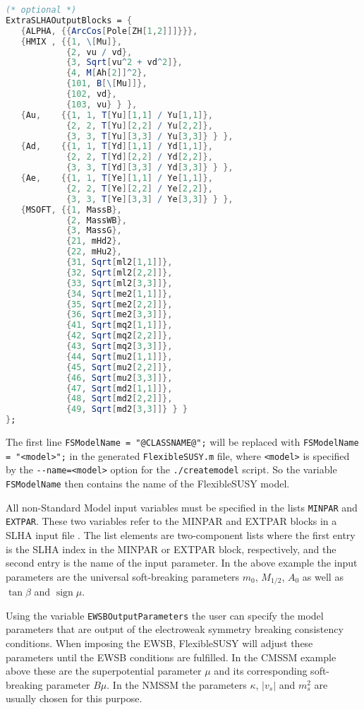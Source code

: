 \documentclass[final,3p,11pt,pdflatex]{elsarticle}
\makeatletter
\newcommand{\fs}{FlexibleSUSY\@\xspace}
\newcommand{\code}[1]{\lstinline|#1|}  %
\DeclareMathOperator{\sign}{sign}
\makeatother
\begin{document}
\begin{lstlisting}[language=Mathematica]
(* optional *)
ExtraSLHAOutputBlocks = {
   {ALPHA, {{ArcCos[Pole[ZH[1,2]]]}}},
   {HMIX , {{1, \[Mu]},
            {2, vu / vd},
            {3, Sqrt[vu^2 + vd^2]},
            {4, M[Ah[2]]^2},
            {101, B[\[Mu]]},
            {102, vd},
            {103, vu} } },
   {Au,    {{1, 1, T[Yu][1,1] / Yu[1,1]},
            {2, 2, T[Yu][2,2] / Yu[2,2]},
            {3, 3, T[Yu][3,3] / Yu[3,3]} } },
   {Ad,    {{1, 1, T[Yd][1,1] / Yd[1,1]},
            {2, 2, T[Yd][2,2] / Yd[2,2]},
            {3, 3, T[Yd][3,3] / Yd[3,3]} } },
   {Ae,    {{1, 1, T[Ye][1,1] / Ye[1,1]},
            {2, 2, T[Ye][2,2] / Ye[2,2]},
            {3, 3, T[Ye][3,3] / Ye[3,3]} } },
   {MSOFT, {{1, MassB},
            {2, MassWB},
            {3, MassG},
            {21, mHd2},
            {22, mHu2},
            {31, Sqrt[ml2[1,1]]},
            {32, Sqrt[ml2[2,2]]},
            {33, Sqrt[ml2[3,3]]},
            {34, Sqrt[me2[1,1]]},
            {35, Sqrt[me2[2,2]]},
            {36, Sqrt[me2[3,3]]},
            {41, Sqrt[mq2[1,1]]},
            {42, Sqrt[mq2[2,2]]},
            {43, Sqrt[mq2[3,3]]},
            {44, Sqrt[mu2[1,1]]},
            {45, Sqrt[mu2[2,2]]},
            {46, Sqrt[mu2[3,3]]},
            {47, Sqrt[md2[1,1]]},
            {48, Sqrt[md2[2,2]]},
            {49, Sqrt[md2[3,3]]} } }
};
\end{lstlisting}
%
The first line \code{FSModelName = "@CLASSNAME@";} will be replaced
with \code{FSModelName = "<model>";} in the generated
\code{FlexibleSUSY.m} file, where \code{<model>} is specified by the
\code{--name=<model>} option for the \code{./createmodel} script.  So
the variable \code{FSModelName} then contains the name of the \fs
model.

All non-Standard Model input variables must be specified in the lists
\code{MINPAR} and \code{EXTPAR}.  These two variables refer to the
MINPAR and EXTPAR blocks in a SLHA input file \cite{Skands:2003cj}.
The list elements are two-component lists where the first entry is the
SLHA index in the MINPAR or EXTPAR block, respectively, and the second
entry is the name of the input parameter.  In the above example the
input parameters are the universal soft-breaking parameters $m_0$,
$M_{1/2}$, $A_0$ as well as $\tan\beta$ and $\sign\mu$.

Using the variable \code{EWSBOutputParameters} the user can
specify the model parameters that are output of the electroweak
symmetry breaking consistency conditions.  When imposing the EWSB, \fs
will adjust these parameters until the EWSB conditions are fulfilled.
In the CMSSM example above these are the superpotential parameter
$\mu$ and its corresponding soft-breaking parameter $B\mu$.  In the
NMSSM the parameters $\kappa$, $|v_s|$ and $m_s^2$ are usually chosen
for this purpose.
\end{document}
